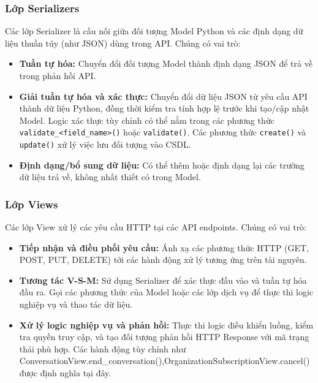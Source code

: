 \subsubsection{Lớp Serializers}
Các lớp Serializer là cầu nối giữa đối tượng Model Python và các định dạng dữ liệu thuần túy (như JSON) dùng trong API. Chúng có vai trò:
\begin{itemize}
    \item \textbf{Tuần tự hóa:} Chuyển đổi đối tượng Model thành định dạng JSON để trả về trong phản hồi API.
    \item \textbf{Giải tuần tự hóa và xác thực:} Chuyển đổi dữ liệu JSON từ yêu cầu API thành dữ liệu Python, đồng thời kiểm tra tính hợp lệ trước khi tạo/cập nhật Model. Logic xác thực tùy chỉnh có thể nằm trong các phương thức \texttt{validate\_<field\_name>()} hoặc \texttt{validate()}. Các phương thức \texttt{create()} và \texttt{update()} xử lý việc lưu đối tượng vào CSDL.
    \item \textbf{Định dạng/bổ sung dữ liệu:} Có thể thêm hoặc định dạng lại các trường dữ liệu trả về, không nhất thiết có trong Model.
\end{itemize}

\subsubsection{Lớp Views}
Các lớp View xử lý các yêu cầu HTTP tại các API endpoints. Chúng có vai trò:
\begin{itemize}
    \item \textbf{Tiếp nhận và điều phối yêu cầu:} Ánh xạ các phương thức HTTP (GET, POST, PUT, DELETE) tới các hành động xử lý tương ứng trên tài nguyên.
    \item \textbf{Tương tác V-S-M:} Sử dụng Serializer để xác thực đầu vào và tuần tự hóa đầu ra. Gọi các phương thức của Model hoặc các lớp dịch vụ để thực thi logic nghiệp vụ và thao tác dữ liệu.
    \item \textbf{Xử lý logic nghiệp vụ và phản hồi:} Thực thi logic điều khiển luồng, kiểm tra quyền truy cập, và tạo đối tượng phản hồi HTTP Response với mã trạng thái phù hợp. Các hành động tùy chỉnh như ConversationView.end\_conversation(),OrganizationSubscriptionView.cancel() được định nghĩa tại đây.
\end{itemize}
